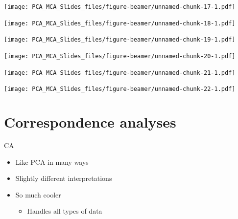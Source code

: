 \documentclass[
  ignorenonframetext,
]{beamer}
\providecommand{\tightlist}{%
  \setlength{\itemsep}{0pt}\setlength{\parskip}{0pt}}
\begin{document}
\begin{frame}

\texttt{[image: PCA\_MCA\_Slides\_files/figure-beamer/unnamed-chunk-17-1.pdf]}

\end{frame}

\begin{frame}

\texttt{[image: PCA\_MCA\_Slides\_files/figure-beamer/unnamed-chunk-18-1.pdf]}

\end{frame}

\begin{frame}

\texttt{[image: PCA\_MCA\_Slides\_files/figure-beamer/unnamed-chunk-19-1.pdf]}

\end{frame}

\begin{frame}

\texttt{[image: PCA\_MCA\_Slides\_files/figure-beamer/unnamed-chunk-20-1.pdf]}

\end{frame}

\begin{frame}

\texttt{[image: PCA\_MCA\_Slides\_files/figure-beamer/unnamed-chunk-21-1.pdf]}

\end{frame}

\begin{frame}

\texttt{[image: PCA\_MCA\_Slides\_files/figure-beamer/unnamed-chunk-22-1.pdf]}

\end{frame}

\hypertarget{correspondence-analyses}{%
\section{Correspondence analyses}\label{correspondence-analyses}}

\begin{frame}{CA}
\protect\hypertarget{ca}{}

\begin{itemize}[<+->]
\tightlist
\item
  Like PCA in many ways
\item
  Slightly different interpretations
\item
  So much cooler

  \begin{itemize}[<+->]
  \tightlist
  \item
    Handles all types of data
  \end{itemize}
\end{itemize}

\end{frame}
\end{document}
